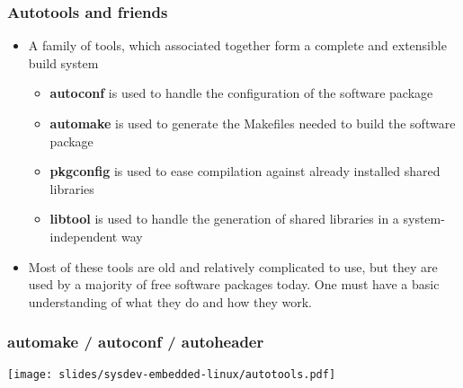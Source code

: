\begin{frame}
  \frametitle{Autotools and friends}
  \begin{itemize}
  \item A family of tools, which associated together form a complete
    and extensible build system
    \begin{itemize}
    \item {\bf autoconf} is used to handle the configuration of the
      software package
    \item {\bf automake} is used to generate the Makefiles needed to
      build the software package
    \item {\bf pkgconfig} is used to ease compilation against already
      installed shared libraries
    \item {\bf libtool} is used to handle the generation of shared
      libraries in a system-independent way
    \end{itemize}
  \item Most of these tools are old and relatively complicated to use,
    but they are used by a majority of free software packages
    today. One must have a basic understanding of what they do and how
    they work.
  \end{itemize}
\end{frame}

\begin{frame}
  \frametitle{automake / autoconf / autoheader}
  \begin{center}
    \texttt{[image: slides/sysdev-embedded-linux/autotools.pdf]}
  \end{center}
\end{frame}

